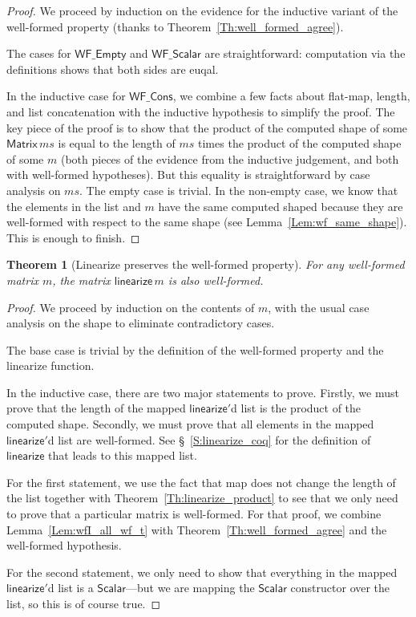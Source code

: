 \documentclass[11pt,conference]{IEEEtran}
\newcommand{\var}[1]{\mathit{#1}}
\newcommand{\func}[1]{\mathsf{#1}}
\newcommand{\iname}[1]{\textsf{#1}}
\theoremstyle{plain} %
\newtheorem{thm}{Theorem}[section]
\theoremstyle{definition}
\theoremstyle{remark}
\begin{document}
\begin{proof}
    We proceed by induction on the evidence for the inductive variant of
    the well-formed property (thanks to Theorem~\ref{Th:well_formed_agree}).

    The cases for \(\iname{WF\_Empty}\) and \(\iname{WF\_Scalar}\) are
    straightforward: computation via the definitions shows that both sides are
    euqal.

    In the inductive case for \(\iname{WF\_Cons}\), we combine a few facts about
    flat-map, length, and list concatenation with the inductive hypothesis to
    simplify the proof. The key piece of the proof is to show that the product
    of the computed shape of some \(\func{Matrix}\, \var{ms}\) is equal to the
    length of \(\var{ms}\) times the product of the computed shape of some \(m\)
    (both pieces of the evidence from the inductive judgement, and both
    with well-formed hypotheses). But this equality is straightforward by case
    analysis on \(\var{ms}\). The empty case is trivial. In the non-empty case,
    we know that the elements in the list and \(m\) have the same computed
    shaped because they are well-formed with respect to the same shape (see
    Lemma~\ref{Lem:wf_same_shape}). This is enough to finish.
\end{proof}

\begin{thm}[Linearize preserves the well-formed property]\label{Th:linearize_wf}
    For any well-formed matrix \(m\), the matrix \(\func{linearize}\, m\) is
    also well-formed.
\end{thm}

\begin{proof}
    We proceed by induction on the contents of \(m\), with the usual case
    analysis on the shape to eliminate contradictory cases.

    The base case is trivial by the definition of the well-formed property and
    the linearize function.

    In the inductive case, there are two major statements to prove. Firstly, we
    must prove that the length of the mapped \(\func{linearize'}\)d list is the
    product of the computed shape. Secondly, we must prove that all elements in
    the mapped \(\func{linearize'}\)d list are well-formed. See
    \S~\ref{S:linearize_coq} for the definition of \(\func{linearize}\) that
    leads to this mapped list.

    For the first statement, we use the fact that map does not change the length
    of the list together with Theorem~\ref{Th:linearize_product} to see that we
    only need to prove that a particular matrix is well-formed. For that proof,
    we combine Lemma~\ref{Lem:wfI_all_wf_t} with
    Theorem~\ref{Th:well_formed_agree} and the well-formed hypothesis.

    For the second statement, we only need to show that everything in the
    mapped \(\func{linearize'}\)d list is a \(\func{Scalar}\)---but we are
    mapping the \(\func{Scalar}\) constructor over the list, so this is of
    course true.
\end{proof}
\end{document}
